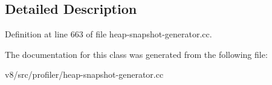 \subsection{Detailed Description}


Definition at line 663 of file heap-\/snapshot-\/generator.\+cc.



The documentation for this class was generated from the following file\+:\begin{DoxyCompactItemize}
\item 
v8/src/profiler/heap-\/snapshot-\/generator.\+cc\end{DoxyCompactItemize}
